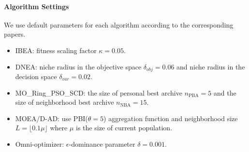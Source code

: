 \documentclass[conference]{IEEEtran}
\begin{document}
\paragraph{Algorithm Settings}
We use default parameters for each algorithm according to the corresponding papers.
\begin{itemize}
    \item IBEA: fitness scaling factor $\kappa=0.05$.
    \item DNEA: niche radius in the objective space $\delta_{obj}=0.06$ and niche radius in the decision space $\delta_{var}=0.02$.
    \item MO\_Ring\_PSO\_SCD: the size of personal best archive $n_{\text{PBA}}=5$ and the size of neighborhood best archive $n_{\text{NBA}}=15$.
    \item MOEA/D-AD: use PBI($\theta=5$) aggregation function and neighborhood size $L = \lfloor 0.1\mu \rfloor$ where $\mu$ is the size of current population.
    \item Omni-optimizer: $\epsilon$-dominance parameter $\delta=0.001$.
\end{itemize}
\end{document}
